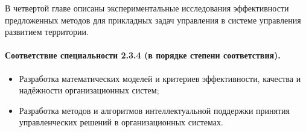 \documentclass[14pt,a4paper]{extarticle}
\begin{document}
В четвертой главе описаны экспериментальные исследования эффективности предложенных методов для прикладных задач управления в системе управления развитием территории.

\paragraph*{Соответствие специальности 2.3.4 (в порядке степени соответствия).}

\begin{itemize}
    \item[2.] Разработка математических моделей и критериев эффективности, качества и надёжности организационных систем;
    \item[9.] Разработка методов и алгоритмов интеллектуальной поддержки принятия управленческих решений в организационных системах.
\end{itemize}
\end{document}
